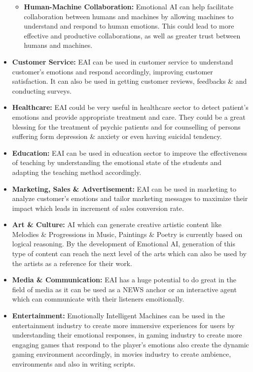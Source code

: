 \begin{itemize}
\begin{itemize}
		\item \textbf{Human-Machine Collaboration:} Emotional AI can help facilitate collaboration between humans and machines by allowing machines to understand and respond to human emotions. This could lead to more effective and productive collaborations, as well as greater trust between humans and machines.
	\end{itemize}
	\item \textbf{Customer Service:} EAI can be used in customer service to understand customer's emotions and respond accordingly, improving customer satisfaction. It can also be used in getting customer reviews, feedbacks \& and conducting surveys.
	\item \textbf{Healthcare:} EAI could be very useful in healthcare sector to detect patient's emotions and provide appropriate treatment and care. They could be a great blessing for the treatment of psychic patients and for counselling of persons suffering form depression \& anxiety or even having suicidal tendency.
	\item \textbf{Education:} EAI can be used in education sector to improve the effectiveness of teaching by understanding the emotional state of the students and adapting the teaching method accordingly.
	\item \textbf{Marketing, Sales \& Advertisement:} EAI can be used in marketing to analyze customer's emotions and tailor marketing messages to maximize their impact which leads in increment of sales conversion rate.
	\item \textbf{Art \& Culture:} AI which can generate creative artistic content like Melodies \& Progressions in Music, Paintings \& Poetry is currently based on logical reasoning. By the development of Emotional AI, generation of this type of content can reach the next level of the arts which can also be used by the artists as a reference for their work.
	\item \textbf{Media \& Communication:} EAI has a huge potential to do great in the field of media as it can be used as a NEWS anchor or an interactive agent which can communicate with their listeners emoitionally.
	\item \textbf{Entertainment:} Emotionally Intelligent Machines can be used in the entertainment industry to create more immersive experiences for users by understanding their emotional responses, in gaming industry to create more engaging games that respond to the player's emotions also create the dynamic gaming environment accordingly, in movies industry to create ambience, environments and also in writing scripts.
\end{itemize}
